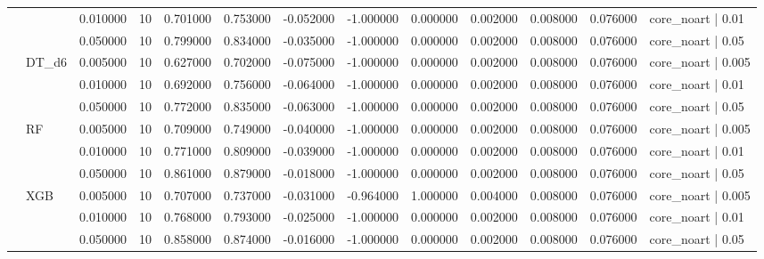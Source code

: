 \begin{tabular}{lllrrrrrrrrrl}
 &  & 0.010000 & 10 & 0.701000 & 0.753000 & -0.052000 & -1.000000 & 0.000000 & 0.002000 & 0.008000 & 0.076000 & core_noart | 0.01 \\
 &  & 0.050000 & 10 & 0.799000 & 0.834000 & -0.035000 & -1.000000 & 0.000000 & 0.002000 & 0.008000 & 0.076000 & core_noart | 0.05 \\
\cline{2-13}
 & \multirow[t]{3}{*}{DT_d6} & 0.005000 & 10 & 0.627000 & 0.702000 & -0.075000 & -1.000000 & 0.000000 & 0.002000 & 0.008000 & 0.076000 & core_noart | 0.005 \\
 &  & 0.010000 & 10 & 0.692000 & 0.756000 & -0.064000 & -1.000000 & 0.000000 & 0.002000 & 0.008000 & 0.076000 & core_noart | 0.01 \\
 &  & 0.050000 & 10 & 0.772000 & 0.835000 & -0.063000 & -1.000000 & 0.000000 & 0.002000 & 0.008000 & 0.076000 & core_noart | 0.05 \\
\cline{2-13}
 & \multirow[t]{3}{*}{RF} & 0.005000 & 10 & 0.709000 & 0.749000 & -0.040000 & -1.000000 & 0.000000 & 0.002000 & 0.008000 & 0.076000 & core_noart | 0.005 \\
 &  & 0.010000 & 10 & 0.771000 & 0.809000 & -0.039000 & -1.000000 & 0.000000 & 0.002000 & 0.008000 & 0.076000 & core_noart | 0.01 \\
 &  & 0.050000 & 10 & 0.861000 & 0.879000 & -0.018000 & -1.000000 & 0.000000 & 0.002000 & 0.008000 & 0.076000 & core_noart | 0.05 \\
\cline{2-13}
 & \multirow[t]{3}{*}{XGB} & 0.005000 & 10 & 0.707000 & 0.737000 & -0.031000 & -0.964000 & 1.000000 & 0.004000 & 0.008000 & 0.076000 & core_noart | 0.005 \\
 &  & 0.010000 & 10 & 0.768000 & 0.793000 & -0.025000 & -1.000000 & 0.000000 & 0.002000 & 0.008000 & 0.076000 & core_noart | 0.01 \\
 &  & 0.050000 & 10 & 0.858000 & 0.874000 & -0.016000 & -1.000000 & 0.000000 & 0.002000 & 0.008000 & 0.076000 & core_noart | 0.05 \\
\cline{1-13} \cline{2-13}
\bottomrule
\end{tabular}
